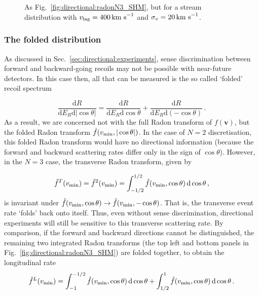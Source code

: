 \begin{figure}[ht!]
\caption[Exact and approximate integrated Radon transforms for $N=3$ components for a stream distribution function]{As Fig.~\ref{fig:directional:radonN3_SHM}, but for a stream distribution with $v_\textrm{lag} = 400 \,\textrm{km s}^{-1}$ and $\sigma_v = 20 \,\textrm{km s}^{-1}$.}
\label{fig:directional:radonN3_STREAM}
\end{figure}

\subsubsection{The folded distribution}

As discussed in Sec.~\ref{sec:directional:experiments}, sense discrimination between forward and backward-going recoils may not be possible with near-future detectors. In this case then, all that can be measured is the so called `folded' recoil spectrum

\begin{equation}
\frac{\mathrm{d}R}{\mathrm{d}E_R\mathrm{d}|\cos\theta|} = \frac{\mathrm{d}R}{\mathrm{d}E_R\mathrm{d}\cos\theta} + \frac{\mathrm{d}R}{\mathrm{d}E_R\mathrm{d}(-\cos\theta)}\,.
\end{equation}
As a result, we are concerned not with the full Radon transform of $f(\textbf{v})$, but the folded Radon transform $\hat{f}(\vmin, |\cos\theta|)$. In the case of $N=2$ discretisation, this folded Radon transform would have no directional information (because the forward and backward scattering rates differ only in the sign of $\cos\theta$). However, in the $N=3$ case, the transverse Radon transform, given by

\begin{equation}
\hat{f}^T(\vmin) = \hat{f}^2(\vmin) = \int_{-1/2}^{1/2} \hat{f}(\vmin, \cos\theta) \,\mathrm{d}\cos\theta\,,
\end{equation}
is invariant under $\hat{f}(\vmin, \cos\theta) \rightarrow \hat{f}(\vmin, -\cos\theta)$. That is, the transverse event rate `folds' back onto itself. Thus, even without sense discrimination, directional experiments will still be sensitive to this transverse scattering rate. By comparison, if the forward and backward directions cannot be distinguished, the remaining two integrated Radon transforms (the top left and bottom panels in Fig.~\ref{fig:directional:radonN3_SHM}) are folded together, to obtain the longitudinal rate
\begin{equation}
\hat{f}^L(\vmin) = \int_{-1}^{-1/2} \hat{f}(\vmin, \cos\theta) \,\mathrm{d}\cos\theta + \int_{1/2}^{1} \hat{f}(\vmin, \cos\theta) \,\mathrm{d}\cos\theta\,.
\end{equation}

